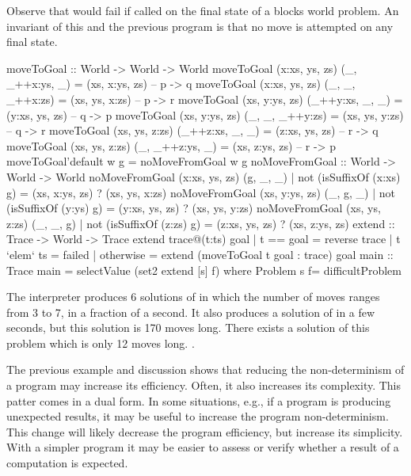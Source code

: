 Observe that  would fail if called on the
final state of a blocks world problem.  An invariant of this
and the previous program is that no move is attempted on any
final state.
%
\begin{prog}
moveToGoal :: World -> World -> World
moveToGoal (x:xs, ys, zs) (_, _++x:ys, _) = (xs, x:ys, zs) -- p -> q
moveToGoal (x:xs, ys, zs) (_, _, _++x:zs) = (xs, ys, x:zs) -- p -> r
moveToGoal (xs, y:ys, zs) (_++y:xs, _, _) = (y:xs, ys, zs) -- q -> p
moveToGoal (xs, y:ys, zs) (_, _, _++y:zs) = (xs, ys, y:zs) -- q -> r
moveToGoal (xs, ys, z:zs) (_++z:xs, _, _) = (z:xs, ys, zs) -- r -> q
moveToGoal (xs, ys, z:zs) (_, _++z:ys, _) = (xs, z:ys, zs) -- r -> p
moveToGoal'default w g = noMoveFromGoal w g
\medskip
noMoveFromGoal :: World -> World -> World
noMoveFromGoal (x:xs, ys, zs) (g, _, _)
  | not (isSuffixOf (x:xs) g) = (xs, x:ys, zs) ? (xs, ys, x:zs)
noMoveFromGoal (xs, y:ys, zs) (_, g, _)
  | not (isSuffixOf (y:ys) g) = (y:xs, ys, zs) ? (xs, ys, y:zs)
noMoveFromGoal (xs, ys, z:zs) (_, _, g)
  | not (isSuffixOf (z:zs) g) = (z:xs, ys, zs) ? (xs, z:ys, zs)
\medskip
extend :: Trace -> World -> Trace
extend trace@(t:ts) goal
  | t == goal    = reverse trace
  | t `elem` ts  = failed
  | otherwise    = extend (moveToGoal t goal : trace) goal
\medskip
main :: Trace
main = selectValue (set2 extend [s] f) 
     where Problem s f= difficultProblem
\end{prog}
%
The \pakcs{} interpreter produces 6 solutions of 
in which the number of moves ranges from 3 to 7, in a fraction of a second.
It also produces a solution of  in a few
seconds, but this solution is 170 moves long.  There exists a
solution of this problem which is only 12 moves long.
.

The previous example and discussion shows that reducing the
non-determinism of a program may increase its efficiency.  Often, it
also increases its complexity. This patter comes in a dual form.
In some situations, e.g., if a program is producing unexpected
results, it may be useful to increase the program non-determinism.
This change will likely decrease the program efficiency,
but increase its simplicity.  With a simpler program it
may be easier to assess or verify whether a result of a computation
is expected.

